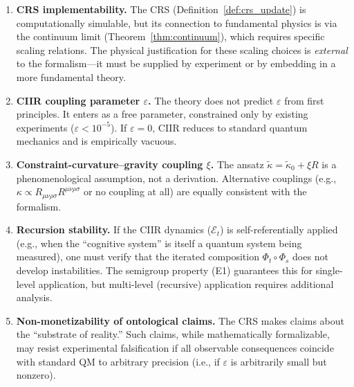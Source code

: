 \documentclass[11pt,a4paper]{article}
\theoremstyle{remark}
\begin{document}
\begin{enumerate}
  \item \textbf{CRS implementability.}  The CRS
    (Definition~\ref{def:crs_update}) is computationally simulable, but
    its connection to fundamental physics is via the continuum limit
    (Theorem~\ref{thm:continuum}), which requires specific scaling
    relations.  The physical justification for these scaling choices is
    \emph{external} to the formalism---it must be supplied by
    experiment or by embedding in a more fundamental theory.

  \item \textbf{CIIR coupling parameter $\varepsilon$.}  The theory
    does not predict $\varepsilon$ from first principles.  It enters as
    a free parameter, constrained only by existing experiments
    ($\varepsilon < 10^{-5}$).  If $\varepsilon = 0$, CIIR reduces to
    standard quantum mechanics and is empirically vacuous.

  \item \textbf{Constraint-curvature--gravity coupling $\xi$.}  The
    ansatz $\tilde{\kappa} = \tilde{\kappa}_0 + \xi R$ is a
    phenomenological assumption, not a derivation.  Alternative
    couplings (e.g., $\kappa \propto R_{\mu\nu\rho\sigma}
    R^{\mu\nu\rho\sigma}$ or no coupling at all) are equally
    consistent with the formalism.

  \item \textbf{Recursion stability.}  If the CIIR dynamics
    ($\mathcal{E}_t$) is self-referentially applied (e.g., when the
    ``cognitive system'' is itself a quantum system being measured),
    one must verify that the iterated composition
    $\Phi_t \circ \Phi_s$ does not develop instabilities.  The
    semigroup property (E1) guarantees this for single-level
    application, but multi-level (recursive) application requires
    additional analysis.

  \item \textbf{Non-monetizability of ontological claims.}  The CRS
    makes claims about the ``substrate of reality.''  Such claims, while
    mathematically formalizable, may resist experimental falsification
    if all observable consequences coincide with standard QM to
    arbitrary precision (i.e., if $\varepsilon$ is arbitrarily small
    but nonzero).
\end{enumerate}

\end{document}
